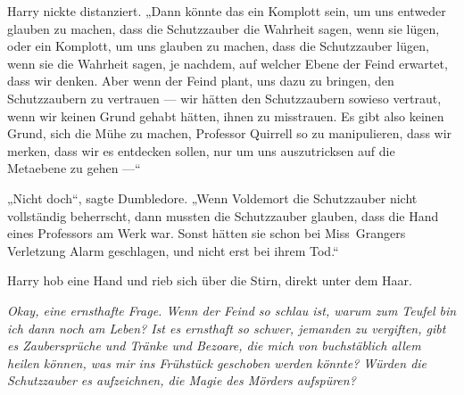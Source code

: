 Harry nickte distanziert.
„Dann könnte das ein Komplott sein, um uns entweder glauben zu machen, dass die Schutzzauber die Wahrheit sagen, wenn sie lügen, oder ein Komplott, um uns glauben zu machen, dass die Schutzzauber lügen, wenn sie die Wahrheit sagen, je nachdem, auf welcher Ebene der Feind erwartet, dass wir denken. Aber wenn der Feind plant, uns dazu zu bringen, den Schutzzaubern zu vertrauen — wir hätten den Schutzzaubern sowieso vertraut, wenn wir keinen Grund gehabt hätten, ihnen zu misstrauen. Es gibt also keinen Grund, sich die Mühe zu machen, Professor Quirrell so zu manipulieren, dass wir merken, dass wir es entdecken sollen, nur um uns auszutricksen auf die Metaebene zu gehen —“

„Nicht doch“, sagte Dumbledore.
„Wenn Voldemort die Schutzzauber nicht vollständig beherrscht, dann mussten die Schutzzauber glauben, dass die Hand eines Professors am Werk war. Sonst hätten sie schon bei Miss~Grangers Verletzung Alarm geschlagen, und nicht erst bei ihrem Tod.“

Harry hob eine Hand und rieb sich über die Stirn, direkt unter dem Haar.

\emph{Okay, eine ernsthafte Frage. Wenn der Feind so schlau ist, warum zum Teufel bin ich dann noch am Leben? Ist es ernsthaft so schwer, jemanden zu vergiften, gibt es Zaubersprüche und Tränke und Bezoare, die mich von buchstäblich allem heilen können, was mir ins Frühstück geschoben werden könnte? Würden die Schutzzauber es aufzeichnen, die Magie des Mörders aufspüren?}

